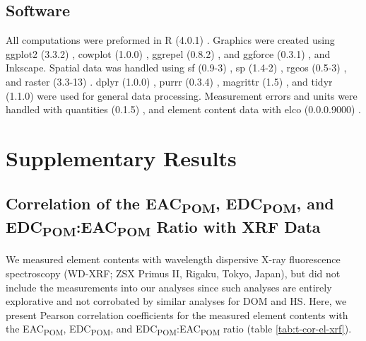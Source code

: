 \documentclass[draft,linenumbers]{agujournal2018}
\begin{document}
\subsection{Software}

All computations were preformed in R (4.0.1) \citep{RCoreTeam.2020}.
Graphics were created using ggplot2 (3.3.2) \citep{Wickham.2016},
cowplot (1.0.0) \citep{Wilke.2019}, ggrepel (0.8.2)
\citep{Slowikowski.2020}, and ggforce (0.3.1) \citep{Pedersen.2019}, and
Inkscape. Spatial data was handled using sf (0.9-3)
\citep{Pebesma.2018b}, sp (1.4-2) \citep{Pebesma.2005}, rgeos (0.5-3)
\citep{Bivand.2020}, and raster (3.3-13) \citep{Hijmans.2020}. dplyr
(1.0.0) \citep{Wickham.2020e}, purrr (0.3.4) \citep{Henry.2020},
magrittr (1.5) \citep{Bache.2014}, and tidyr (1.1.0)
\citep{Wickham.2020f} were used for general data processing. Measurement
errors and units were handled with quantities (0.1.5)
\citep{Pebesma.2016, Ucar.2019}, and element content data with elco
(0.0.0.9000) \citep{Teickner.2020e}.

\section{Supplementary Results}

\subsection{\texorpdfstring{Correlation of the EAC\textsubscript{POM},
EDC\textsubscript{POM}, and
EDC\textsubscript{POM}:EAC\textsubscript{POM} Ratio with XRF
Data}{Correlation of the EAC, EDC, and EDC:EAC Ratio with XRF Data}}

We measured element contents with wavelength dispersive X-ray
fluorescence spectroscopy (WD-XRF; ZSX Primus II, Rigaku, Tokyo, Japan),
but did not include the measurements into our analyses since such
analyses are entirely explorative and not corrobated by similar analyses
for DOM and HS. Here, we present Pearson correlation coefficients for
the measured element contents with the EAC\textsubscript{POM},
EDC\textsubscript{POM}, and
EDC\textsubscript{POM}:EAC\textsubscript{POM} ratio (table
\ref{tab:t-cor-el-xrf}).
\end{document}
